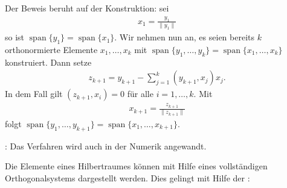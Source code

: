\documentclass[letterpaper,10pt,english]{jupyterBook}
\begin{document}
Der Beweis beruht auf der Konstruktion: sei
\begin{equation*}
\begin{split}x_1 = \frac{y_1}{\|y_1\|}\end{split}
\end{equation*}
so ist \(\mathop{span}\{y_1\} = \mathop{span}\{x_1\}\). Wir nehmen nun an, es seien bereits \(k\) orthonormierte Elemente \(x_1, \ldots, x_k\) mit \(\mathop{span}\{y_1, \ldots, y_k\} = \mathop{span}\{x_1,\ldots, x_k\}\) konstruiert. Dann setze
\begin{equation*}
\begin{split}z_{k+1} = y_{k+1} - \sum_{j=1}^k (y_{k+1},x_j) x_j.\end{split}
\end{equation*}
In dem Fall gilt \((z_{k+1},x_i) = 0\) für alle \(i = 1, \ldots, k\). Mit
\begin{equation*}
\begin{split}x_{k+1} = \frac{z_{k+1}}{\|z_{k+1}\|}\end{split}
\end{equation*}
folgt \(\mathop{span}\{y_1, \ldots, y_{k+1}\} = \mathop{span}\{x_1,\ldots, x_{k+1}\}\).

: Das Verfahren wird auch in der Numerik angewandt.


\nopagebreak


{\hyperref[\detokenize{Funktionalanalysis/BeispielOrthogonalisierungSchmidt::doc}]{}}



Die Elemente eines Hilbertraumes können mit Hilfe eines vollständigen Orthogonalsystems dargestellt werden. Dies gelingt mit Hilfe der :
\end{document}
